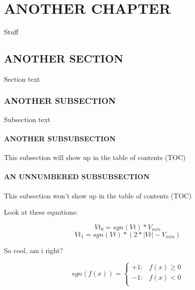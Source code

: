 \documentclass[../Main/main.tex]{subfiles}
\begin{document}
\chapter{ANOTHER CHAPTER}

Stuff

\section{ANOTHER SECTION}
Section text

\subsection{ANOTHER SUBSECTION}

Subsection text

\subsubsection{ANOTHER SUBSUBSECTION}

This subsection will show up in the table of contents (TOC)

\subsubsection*{AN UNNUMBERED SUBSUBSECTION}

This subsection won't show up in the table of contents (TOC)

Look at these equations:

\begin{equation}
    Vt_{0} = sgn(Vt) * V_{min}
\end{equation}
\begin{equation}
    Vt_{1} = sgn(Vt) * (2*|Vt|-V_{min})
\end{equation}

So cool, am i right?

\begin{equation}
    sgn(f(x)) =
    \begin{cases}
        +1: & f(x) \geq 0\\
        -1: & f(x) < 0\\
    \end{cases}
\end{equation}
\end{document}
